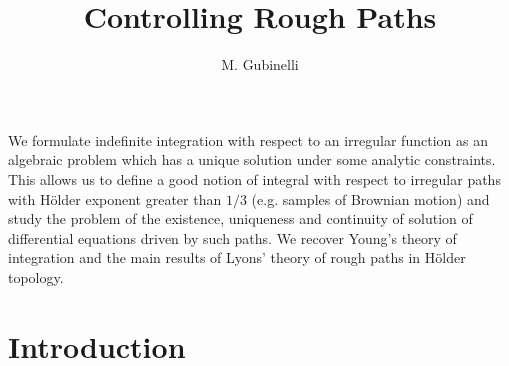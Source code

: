 \documentclass[a4paper,12pt,reqno]{amsproc}
\begin{document}
\title{Controlling Rough Paths}
\author{M. Gubinelli}
\address{Dipartimento di  Matematica Applicata ``U.Dini''
Via Bonanno Pisano, 25 bis - 56125 Pisa, ITALIA}

\abstract
 We formulate indefinite integration with respect to an irregular
 function as an algebraic problem which has a unique solution under
 some analytic constraints.
This allows us to define a
 good notion of integral with respect to  irregular paths with
 H\"older exponent greater than $1/3$ (e.g.
 samples of Brownian motion) and study the problem of the existence,
 uniqueness and continuity of solution of
 differential equations driven by such paths.
 We recover 
 Young's theory of integration  and
 the main results of Lyons' theory of rough paths in H\"older topology.  
\endabstract
\maketitle
\section{Introduction}
\end{document}
